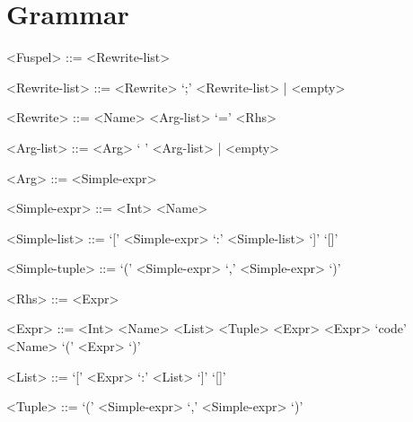 \section{Grammar}
\label{sec:grammar}

\setlength{\grammarparsep}{4pt}
\setlength{\grammarindent}{10em}
\begin{grammar}
	<Fuspel> ::= <Rewrite-list>

	<Rewrite-list> ::= <Rewrite> `;' <Rewrite-list> | <empty>

	<Rewrite> ::= <Name> <Arg-list> `=' <Rhs>

	<Arg-list> ::= <Arg> ` ' <Arg-list> | <empty>

	<Arg> ::= <Simple-expr>

	<Simple-expr> ::= <Int>
		\alt <Simple-list>
		\alt <Simple-tuple>

	<Simple-list> ::= `[' <Simple-expr> `:' <Simple-list> `]'
		\alt `[]'
	
	<Simple-tuple> ::= `(' <Simple-expr> `,' <Simple-expr> `)'

	<Rhs> ::= <Expr>

	<Expr> ::= <Int>
		\alt <Tuple>
		 <Expr>
		\alt `code' <Name>
		\alt `(' <Expr> `)'

	<List> ::= `[' <Expr> `:' <List> `]'
		\alt `[]'
	
	<Tuple> ::= `(' <Simple-expr> `,' <Simple-expr> `)'
\end{grammar}
